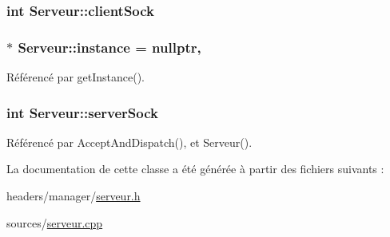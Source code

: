 \hypertarget{classServeur_adf04df85df6e35a94fedcacb037abc97}{
\subsubsection[{client\-Sock}]{\setlength{\rightskip}{0pt plus 5cm}int Serveur\-::client\-Sock\hspace{0.3cm}{\ttfamily [private]}}}\label{classServeur_adf04df85df6e35a94fedcacb037abc97}
\hypertarget{classServeur_a489b673bfbcfa8f6909b793fe15e9cf7}{
\subsubsection[{instance}]{ $\ast$ Serveur\-::instance = nullptr\hspace{0.3cm}{\ttfamily [static]}, {\ttfamily [private]}}}\label{classServeur_a489b673bfbcfa8f6909b793fe15e9cf7}


Référencé par get\-Instance().

\hypertarget{classServeur_aff31b98591fc01c7deb0d1ad1052c4a3}{
\subsubsection[{server\-Sock}]{\setlength{\rightskip}{0pt plus 5cm}int Serveur\-::server\-Sock\hspace{0.3cm}{\ttfamily [private]}}}\label{classServeur_aff31b98591fc01c7deb0d1ad1052c4a3}


Référencé par Accept\-And\-Dispatch(), et Serveur().



La documentation de cette classe a été générée à partir des fichiers suivants \-:\begin{DoxyCompactItemize}
\item 
headers/manager/\hyperlink{serveur_8h}{serveur.\-h}\item 
sources/\hyperlink{serveur_8cpp}{serveur.\-cpp}\end{DoxyCompactItemize}

